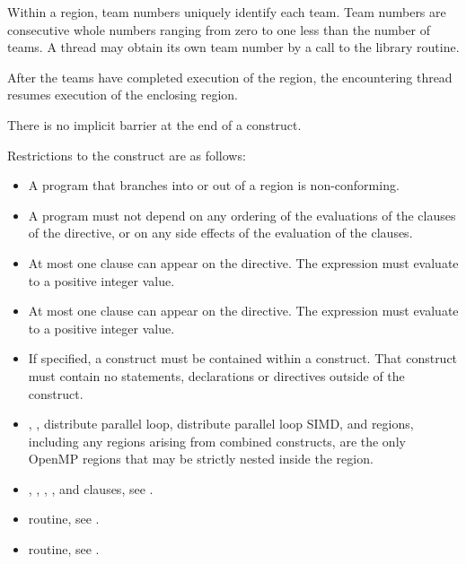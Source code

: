 Within a  region, team numbers uniquely identify each team. Team numbers are 
consecutive whole numbers ranging from zero to one less than the number of teams. A 
thread may obtain its own team number by a call to the  library 
routine.

After the teams have completed execution of the  region, the encountering thread 
resumes execution of the enclosing  region.

There is no implicit barrier at the end of a  construct.

\restrictions
Restrictions to the  construct are as follows:

\begin{itemize}
\item A program that branches into or out of a  region is non-conforming.

\item A program must not depend on any ordering of the evaluations of the clauses of the 
 directive, or on any side effects of the evaluation of the clauses.

\item At most one  clause can appear on the directive. The 
 expression must evaluate to a positive integer value.

\item At most one  clause can appear on the directive. The 
expression must evaluate to a positive integer value.

\item If specified, a  construct must be contained within a  construct. That  construct must contain no statements, declarations or directives outside of the  construct.

\item {}, , distribute parallel loop,
distribute parallel loop SIMD, and  regions, including any
 regions arising from combined constructs, are the only OpenMP regions
that may be strictly nested inside the  region.

\end{itemize}

\crossreferences
\begin{itemize}

\item {}, , , , and  clauses, see 
.

\item {} routine, see 
.

\item {} routine, see 
.
\end{itemize}









